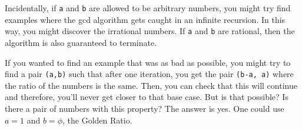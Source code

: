 Incidentally, if \texttt{a} and \texttt{b} are allowed to be arbitrary numbers, you might try find examples where the gcd algorithm gets caught in an infinite recursion.  In this way, you might discover the irrational numbers.  If \texttt{a} and \texttt{b} are rational, then the algorithm is also guaranteed to terminate.


If you wanted to find an example that was as bad as possible, you might try to find a pair \texttt{(a,b)} such that after one iteration, you get the pair \texttt{(b-a, a)} where the ratio of the numbers is the same.  Then, you can check that this will continue and therefore, you'll never get closer to that base case.  But is that possible?  Is there a pair of numbers with this property?  The answer is yes.  One could use $a = 1$ and $b = \phi$, the Golden Ratio.

